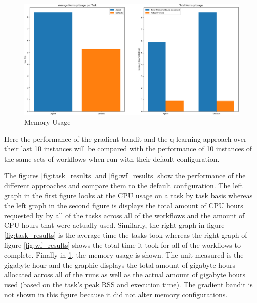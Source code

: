 \begin{figure}
    \centering
        \includegraphics[width=\textwidth]{fig/cropped_memory_usage_final.png}
        \caption{Memory Usage}
        \label{fig:mem_use}
\end{figure}

Here the performance of the gradient bandit and the q-learning approach over their last 10 instances will be compared with the performance of 10 instances of the same sets of workflows when run with their default configuration.

The figures \ref{fig:task_results} and \ref{fig:wf_results} show the performance of the different approaches and compare them to the default configuration. The left graph in the first figure looks at the CPU usage on a task by task basis whereas the left graph in the second figure is displays the total amount of CPU hours requested by by all of the tasks across all of the workflows and the amount of CPU hours that were actually used. Similarly, the right graph in figure \ref{fig:task_results} is the average time the tasks took whereas the right graph of figure \ref{fig:wf_results} shows the total time it took for all of the workflows to complete. Finally in \ref{fig:mem_use}, the memory usage is shown. The unit measured is the gigabyte hour and the graphic displays the total amount of gigabyte hours allocated across all of the runs as well as the actual amount of gigabyte hours used (based on the task’s peak RSS and execution time). The gradient bandit is not shown in this figure because it did not alter memory configurations.

